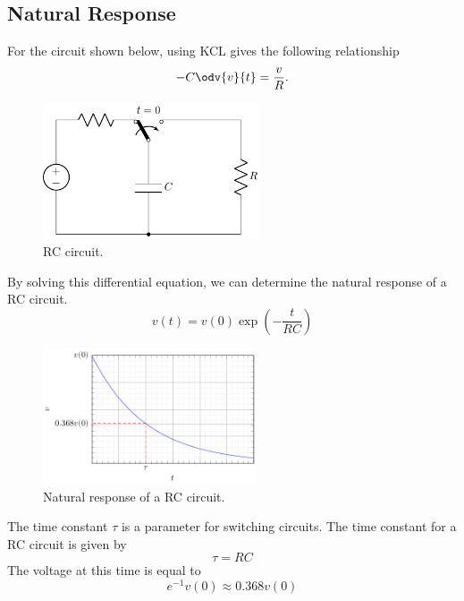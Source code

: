 \documentclass{article}
\begin{document}
\subsection{Natural Response}
\begin{definition}
    For the circuit shown below, using KCL gives the following relationship
    \begin{equation*}
        -C \odv{v}{t} = \frac{v}{R}.
    \end{equation*}
    \begin{figure}[H]
        \centering
        \includegraphics[height = 4cm, keepaspectratio = true]{figures/rc_natural.pdf}
        \caption{RC circuit.}
    \end{figure}
    By solving this differential equation, we can determine the natural response of a
    RC circuit.
    \begin{equation*}
        v(t) = v(0)\exp{\left( -\frac{t}{RC} \right)}
    \end{equation*}
    \begin{figure}[H]
        \centering
        \includegraphics[height = 4cm, keepaspectratio = true]{figures/rc_natural_plot.pdf}
        \caption{Natural response of a RC circuit.}
    \end{figure}
\end{definition}
\begin{definition}
    The time constant \(\tau\) is a parameter for switching circuits. The time constant for a RC circuit is given by
    \begin{equation*}
        \tau = RC
    \end{equation*}
    The voltage at this time is equal to
    \begin{equation*}
        e^{-1}v(0) \approx 0.368v(0)
    \end{equation*}
\end{definition}
\end{document}
